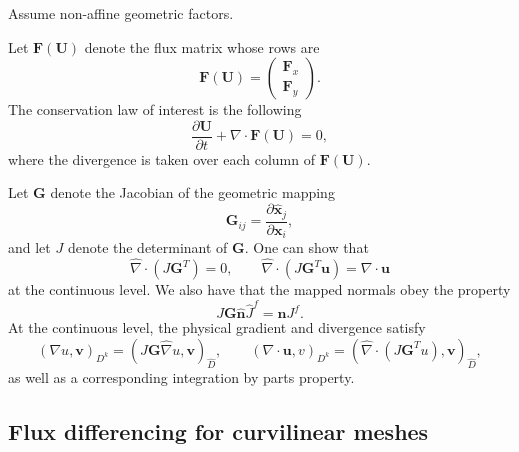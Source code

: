 \documentclass[preprint,10pt]{article}
\theoremstyle{definition}
\theoremstyle{lemma}
\theoremstyle{theorem}
\theoremstyle{assumption}
\renewcommand{\hat}{\widehat}
\newcommand{\pd}[2]{\frac{\partial#1}{\partial#2}}
\newcommand{\LRp}[1]{\left( #1 \right)}
\newcommand{\Grad} {\ensuremath{\nabla}}
\begin{document}
Assume non-affine geometric factors.  

Let $\bm{F}(\bm{U})$ denote the flux matrix whose rows are 
\[
\bm{F}(\bm{U}) = \LRp{
\begin{array}{c}
\bm{F}_x \\
\bm{F}_y
\end{array}
}.
\]
The conservation law of interest is the following
\[
\pd{\bm{U}}{t} + \Grad \cdot \bm{F}(\bm{U}) = 0,
\]
where the divergence is taken over each column of $\bm{F}(\bm{U})$.  

Let $\bm{G}$ denote the Jacobian of the geometric mapping
\[
\bm{G}_{ij} = \pd{\hat{\bm{x}}_j}{\bm{x}_i},
\]
and let $J$ denote the determinant of $\bm{G}$.  One can show that
\[
\hat{\Grad} \cdot \LRp{J\bm{G}^T} = 0, \qquad \hat{\Grad} \cdot \LRp{J\bm{G}^T\bm{u}} = \Grad \cdot \bm{u}
\]
at the continuous level.  We also have that the mapped normals obey the property
\[
J\bm{G} \hat{\bm{n}}\hat{J}^f = \bm{n}J^f.
\]
At the continuous level, the physical gradient and divergence satisfy
\[
\LRp{\Grad u, \bm{v}}_{D^k} = \LRp{J\bm{G} \hat{\Grad} u,\bm{v}}_{\hat{D}}, \qquad \LRp{\Grad\cdot \bm{u},v}_{D^k} = \LRp{\hat{\Grad}\cdot \LRp{J\bm{G}^T u},\bm{v}}_{\hat{D}}, 
\]
as well as a corresponding integration by parts property.  

\subsection{Flux differencing for curvilinear meshes}
\end{document}
